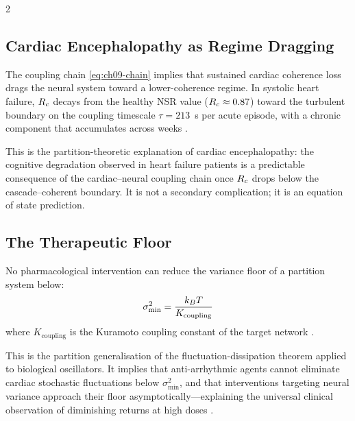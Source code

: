 \begin{multicols}{2}
\columnbreak

\subsection{Cardiac Encephalopathy as Regime Dragging}

The coupling chain \eqref{eq:ch09-chain} implies that sustained
cardiac coherence loss drags the neural system toward a lower-coherence
regime. In systolic heart failure, $R_c$ decays from the healthy NSR
value ($R_c \approx 0.87$) toward the turbulent boundary on the
coupling timescale $\tau = 213$~s per acute episode, with a chronic
component that accumulates across weeks \citep{havakuk2017heart}.

This is the partition-theoretic explanation of cardiac encephalopathy:
the cognitive degradation observed in heart failure patients is a
predictable consequence of the cardiac--neural coupling chain once
$R_c$ drops below the cascade--coherent boundary. It is not a secondary
complication; it is an equation of state prediction.

\subsection{The Therapeutic Floor}

\begin{theorem}
\label{thm:ch09-floor}
No pharmacological intervention can reduce the variance floor of a
partition system below:
\begin{equation}
\sigma^2_{\min} = \frac{k_B T}{K_{\mathrm{coupling}}}
\label{eq:ch09-floor}
\end{equation}
where $K_{\mathrm{coupling}}$ is the Kuramoto coupling constant of
the target network \citep{sachikonye2024_cardioneural}.
\end{theorem}

This is the partition generalisation of the fluctuation-dissipation
theorem applied to biological oscillators. It implies that
anti-arrhythmic agents cannot eliminate cardiac stochastic fluctuations
below $\sigma^2_{\min}$, and that interventions targeting neural
variance approach their floor asymptotically---explaining the universal
clinical observation of diminishing returns at high doses
\citep{ponikowski2016esc}.

\end{multicols}


